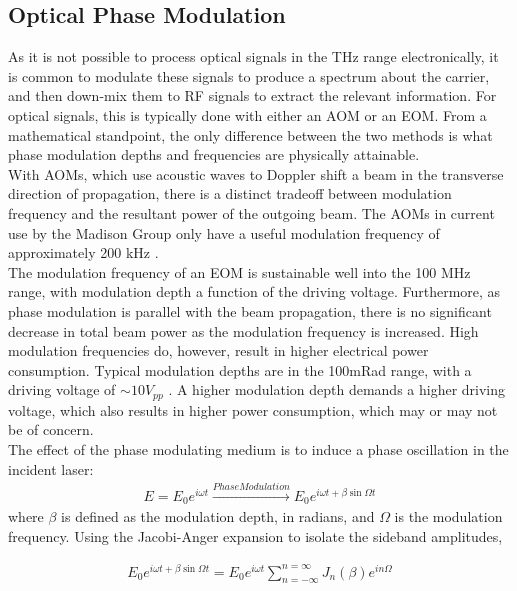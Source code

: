 \subsection{Optical Phase Modulation}

As it is not possible to process optical signals in the THz range electronically,
it is common to modulate these signals to produce a spectrum about the carrier,
and then down-mix them to RF signals to extract the relevant information.
For optical signals, this is typically done with either an AOM or an EOM. From
a mathematical standpoint, the only difference between the two methods is
what phase modulation depths and frequencies are physically attainable. \\

With AOMs, which use acoustic waves to Doppler shift a beam in the transverse
direction of propagation, there is a distinct tradeoff between modulation
frequency and the resultant power of the outgoing beam.  The AOMs in current use by the Madison Group only have a useful
modulation frequency of approximately 200 kHz \cite{madison14}. \\

The modulation frequency of an EOM is sustainable well into the 100 MHz range,
with modulation depth a function of the driving voltage. Furthermore, as
phase modulation is parallel with the beam propagation, there is no significant
decrease in total beam power as the modulation frequency is increased. High modulation
frequencies do, however, result in higher electrical power consumption.
Typical modulation depths are in the 100mRad range, with a driving voltage of
$\sim 10 V_{pp}$ \cite{thorlabs_eom}. A higher modulation depth demands a higher driving voltage,
which also results in higher power consumption, which may or may not be of
concern. \\

The effect of the phase modulating medium is to induce a phase oscillation
in the incident laser:
\begin{gather}
  E = E_0 e^{i\omega t} \xrightarrow{Phase Modulation}
    E_0 e^{i \omega t + \beta \sin \Omega t}
\end{gather}
where $\beta$ is defined as the modulation depth, in radians, and $\Omega$ is the
modulation frequency. Using the Jacobi-Anger expansion to isolate the sideband
amplitudes,

\begin{gather}
  E_0 e^{i \omega t + \beta \sin \Omega t}  =
  E_0 e^{i\omega t} \sum_{n = -\infty}^{n = \infty} J_n(\beta)e^{in\Omega}
\end{gather}


